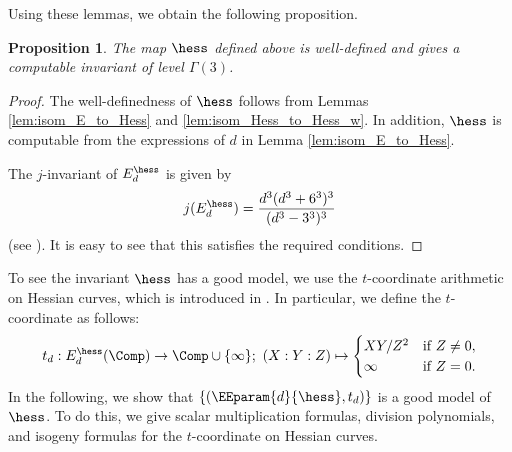 \documentclass{amsart}
\newtheorem{proposition}[theorem]{Proposition}
\theoremstyle{definition}
\theoremstyle{remark}
\numberwithin{equation}{section}
\begin{document}
Using these lemmas,
we obtain the following proposition.
\begin{proposition}
    The map $\hess$ defined above
    is well-defined
    and gives a computable invariant of level $\Gamma(3)$.
\end{proposition}
\begin{proof}
    The well-definedness of $\hess$ follows from
    Lemmas \ref{lem:isom_E_to_Hess} and \ref{lem:isom_Hess_to_Hess_w}.
    In addition, $\hess$ is computable
    from the expressions of $d$ in Lemma \ref{lem:isom_E_to_Hess}.

    The $j$-invariant of $E_d^\hess$ is given by
    \begin{equation*}
        j(E_d^\hess) = \frac{d^3(d^3 + 6^3)^3}{(d^3 - 3^3)^3}
    \end{equation*}
    (see \cite[\S 2]{PKC:FarJoy10}).
    It is easy to see that this satisfies the required conditions.
\end{proof}
To see the invariant $\hess$ has a good model,
we use the $t$-coordinate arithmetic on Hessian curves,
which is introduced in \cite{FouazouLontouo2023}.
In particular,
we define the $t$-coordinate as follows:
\begin{equation*}
    t_d : E_d^\hess(\Comp) \to \Comp \cup \{\infty\};\
    (X : Y : Z) \mapsto
    \begin{cases}
        XY/Z^2 & \text{if } Z \neq 0,\\
        \infty & \text{if } Z = 0.
    \end{cases}
\end{equation*}
In the following,
we show that $\{(\EEparam{d}{\hess}, t_d)\}$
is a good model of $\hess$.
To do this,
we give scalar multiplication formulas,
division polynomials, and isogeny formulas
for the $t$-coordinate on Hessian curves.
\end{document}

